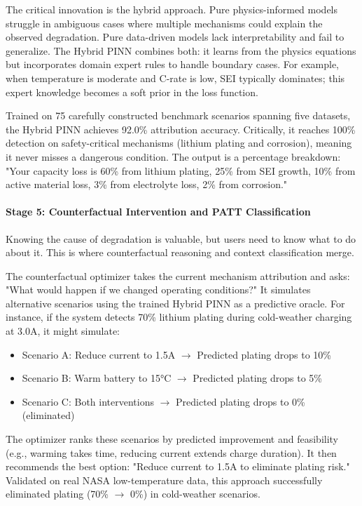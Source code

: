 \documentclass[5p,times,authoryear]{elsarticle}
\begin{document}
The critical innovation is the hybrid approach. Pure physics-informed models struggle in ambiguous cases where multiple mechanisms could explain the observed degradation. Pure data-driven models lack interpretability and fail to generalize. The Hybrid PINN combines both: it learns from the physics equations but incorporates domain expert rules to handle boundary cases. For example, when temperature is moderate and C-rate is low, SEI typically dominates; this expert knowledge becomes a soft prior in the loss function.

Trained on 75 carefully constructed benchmark scenarios spanning five datasets, the Hybrid PINN achieves 92.0\% attribution accuracy. Critically, it reaches 100\% detection on safety-critical mechanisms (lithium plating and corrosion), meaning it never misses a dangerous condition. The output is a percentage breakdown: "Your capacity loss is 60\% from lithium plating, 25\% from SEI growth, 10\% from active material loss, 3\% from electrolyte loss, 2\% from corrosion."

\paragraph{Stage 5: Counterfactual Intervention and PATT Classification}

Knowing the cause of degradation is valuable, but users need to know what to do about it. This is where counterfactual reasoning and context classification merge.

The counterfactual optimizer takes the current mechanism attribution and asks: "What would happen if we changed operating conditions?" It simulates alternative scenarios using the trained Hybrid PINN as a predictive oracle. For instance, if the system detects 70\% lithium plating during cold-weather charging at 3.0A, it might simulate:
\begin{itemize}
    \item Scenario A: Reduce current to 1.5A $\rightarrow$ Predicted plating drops to 10\%
    \item Scenario B: Warm battery to 15°C $\rightarrow$ Predicted plating drops to 5\%
    \item Scenario C: Both interventions $\rightarrow$ Predicted plating drops to 0\% (eliminated)
\end{itemize}

The optimizer ranks these scenarios by predicted improvement and feasibility (e.g., warming takes time, reducing current extends charge duration). It then recommends the best option: "Reduce current to 1.5A to eliminate plating risk." Validated on real NASA low-temperature data, this approach successfully eliminated plating (70\% $\rightarrow$ 0\%) in cold-weather scenarios.
\end{document}
